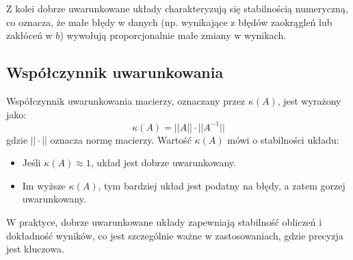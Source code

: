 \documentclass[a4paper, 12pt]{article}
\begin{document}
Z kolei dobrze uwarunkowane układy charakteryzują się stabilnością numeryczną, co oznacza, że małe błędy w danych (np. wynikające z błędów zaokrągleń lub zakłóceń w \( b \)) wywołują proporcjonalnie małe zmiany w wynikach.

\subsection{Współczynnik uwarunkowania}
Współczynnik uwarunkowania macierzy, oznaczany przez \( \kappa(A) \), jest wyrażony jako:
\[
\kappa(A) = ||A|| \cdot ||A^{-1}||
\]
gdzie \( || \cdot || \) oznacza normę macierzy. Wartość \( \kappa(A) \) mówi o stabilności układu:
\begin{itemize}
    \item Jeśli \( \kappa(A) \approx 1 \), układ jest dobrze uwarunkowany.
    \item Im wyższe \( \kappa(A) \), tym bardziej układ jest podatny na błędy, a zatem gorzej uwarunkowany.
\end{itemize}
W praktyce, dobrze uwarunkowane układy zapewniają stabilność obliczeń i dokładność wyników, co jest szczególnie ważne w zastosowaniach, gdzie precyzja jest kluczowa.
\end{document}
